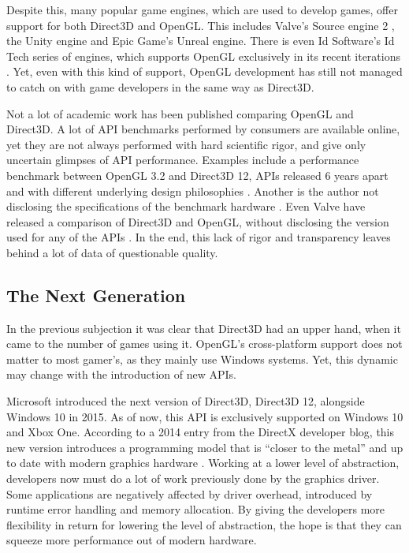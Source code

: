 Despite this, many popular game engines, which are used to develop games, offer support for both Direct3D and OpenGL.
This includes Valve’s Source engine 2 \cite{sourceEngine}, the Unity engine \cite{unityEngine} and Epic Game’s Unreal engine\cite{unrealEngine}.
There is even Id Software’s Id Tech series of engines, which supports OpenGL exclusively in its recent iterations \cite{idTech}.
Yet, even with this kind of support, OpenGL development has still not managed to catch on with game developers in the same way as Direct3D.  

Not a lot of academic work has been published comparing OpenGL and Direct3D.
A lot of \gls{API} benchmarks performed by consumers are available online, yet they are not always performed with hard scientific rigor, and give only uncertain glimpses of \gls{API} performance.
Examples include a performance benchmark between OpenGL 3.2 and Direct3D 12, \glspl{API} released 6 years apart and with different underlying design philosophies \cite{geek3DBenchmark}.
Another is the author not disclosing the specifications of the benchmark hardware \cite{gTrucBenchmark}.
Even Valve have released a comparison of Direct3D and OpenGL, without disclosing the version used for any of the \glspl{API} \cite{valveBenchmark}.
In the end, this lack of rigor and transparency leaves behind a lot of data of questionable quality.

\subsection{The Next Generation}
In the previous subjection it was clear that Direct3D had an upper hand, when it came to the number of games using it.
OpenGL’s cross-platform support does not matter to most gamer’s, as they mainly use Windows systems.
Yet, this dynamic may change with the introduction of new \glspl{API}.

Microsoft introduced the next version of Direct3D, Direct3D 12, alongside Windows 10 in 2015.
As of now, this \gls{API} is exclusively supported on Windows 10 and Xbox One.
According to a 2014 entry from the DirectX developer blog, this new version introduces a programming model that is “closer to the metal” and up to date with modern graphics hardware \cite{directXBlog}.
Working at a lower level of abstraction, developers now must do a lot of work previously done by the graphics driver.
Some applications are negatively affected by driver overhead, introduced by runtime error handling and memory allocation.
By giving the developers more flexibility in return for lowering the level of abstraction, the hope is that they can squeeze more performance out of modern hardware.
  
